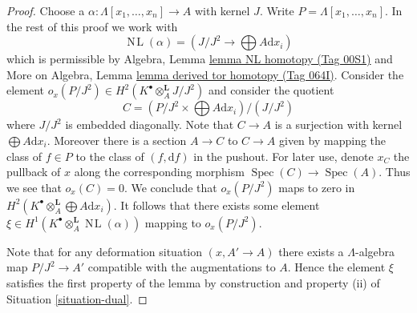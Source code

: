 \documentclass{amsart}
\theoremstyle{plain}
\theoremstyle{definition}
\theoremstyle{remark}
\numberwithin{equation}{subsection}
\def\Spec{\mathop{\mathrm{Spec}}}
\def\NL{\mathop{N\!L}\nolimits}
\begin{document}
\begin{proof}
Choose a $\alpha : \Lambda[x_1, \ldots, x_n] \to A$ with kernel $J$.
Write $P = \Lambda[x_1, \ldots, x_n]$. In the rest of this proof we work with
$$
\NL(\alpha) = (J/J^2 \longrightarrow \bigoplus A \text{d}x_i)
$$
which is permissible by
Algebra, Lemma \href{https://stacks.math.columbia.edu/tag/00S1}{lemma NL homotopy (Tag 00S1)}
and
More on Algebra, Lemma \href{https://stacks.math.columbia.edu/tag/064I}{lemma derived tor homotopy (Tag 064I)}.
Consider the element
$o_x(P/J^2) \in H^2(K^\bullet \otimes_A^\mathbf{L} J/J^2)$ and consider
the quotient
$$
C = (P/J^2 \times \bigoplus A \text{d}x_i)/(J/J^2)
$$
where $J/J^2$ is embedded diagonally. Note that $C \to A$ is a surjection
with kernel $\bigoplus A\text{d}x_i$. Moreover there is a section
$A \to C$ to $C \to A$ given by mapping the class of $f \in P$ to the class
of $(f, \text{d}f)$ in the pushout. For later use, denote $x_C$ the
pullback of $x$ along the corresponding morphism $\Spec(C) \to \Spec(A)$.
Thus we see that $o_x(C) = 0$.
We conclude that $o_x(P/J^2)$ maps to zero in
$H^2(K^\bullet \otimes_A^\mathbf{L} \bigoplus A\text{d}x_i)$.
It follows that there exists some element
$\xi \in H^1(K^\bullet \otimes_A^\mathbf{L} \NL(\alpha))$
mapping to $o_x(P/J^2)$.

\medskip\noindent
Note that for any deformation situation $(x, A' \to A)$ there exists
a $\Lambda$-algebra map $P/J^2 \to A'$ compatible with the augmentations
to $A$. Hence the
element $\xi$ satisfies the first property of the lemma by construction
and property (ii) of Situation \ref{situation-dual}.


\end{proof}
\end{document}
